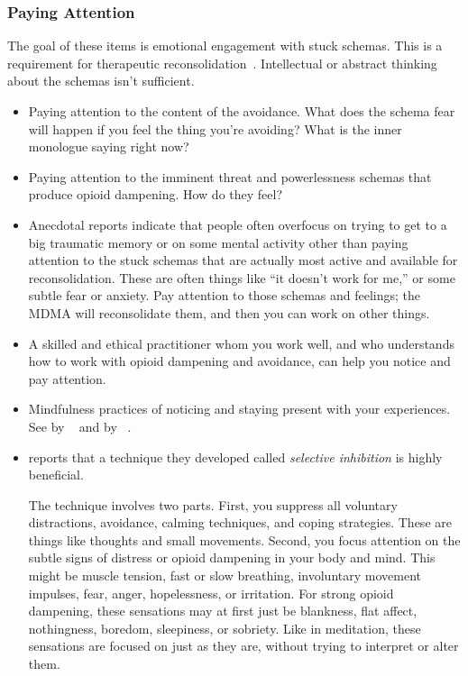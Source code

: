 \documentclass[11pt,oneside]{book}
\let\cite\parencite
\newcommand{\prosecite}[1]{\citetitle{#1} by \citefullauthor{#1}~\cite{#1}}
\begin{document}
\subsubsection*{Paying Attention}
The goal of these items is emotional engagement with stuck schemas. This is a requirement for therapeutic reconsolidation~\cite{ecker2015misunderstood}. Intellectual or abstract thinking about the schemas isn't sufficient.
\begin{itemize}
    \item Paying attention to the content of the avoidance. What does the schema fear will happen if you feel the thing you're avoiding? What is the inner monologue saying right now?
    \item Paying attention to the imminent threat and powerlessness schemas that produce opioid dampening. How do they feel?
    \item Anecdotal reports indicate that people often overfocus on trying to get to a big traumatic memory or on some mental activity other than paying attention to the stuck schemas that are actually most active and available for reconsolidation. These are often things like \enquote{it doesn't work for me,} or some subtle fear or anxiety. Pay attention to those schemas and feelings; the MDMA will reconsolidate them, and then you can work on other things.
    \item A skilled and ethical practitioner whom you work well, and who understands how to work with opioid dampening and avoidance, can help you notice and pay attention.
    \item Mindfulness practices of noticing and staying present with your experiences. See \prosecite{rain} and \prosecite{bodyscan}.
    \item \textcite{razviPSIP} reports that a technique they developed called \textit{selective inhibition} is highly beneficial.
    
    The technique involves two parts. First, you suppress all voluntary distractions, avoidance, calming techniques, and coping strategies. These are things like thoughts and small movements. Second, you focus attention on the subtle signs of distress or opioid dampening in your body and mind. This might be muscle tension, fast or slow breathing, involuntary movement impulses, fear, anger, hopelessness, or irritation. For strong opioid dampening, these sensations may at first just be blankness, flat affect, nothingness, boredom, sleepiness, or sobriety. Like in meditation, these sensations are focused on just as they are, without trying to interpret or alter them.


\end{itemize}
\end{document}
